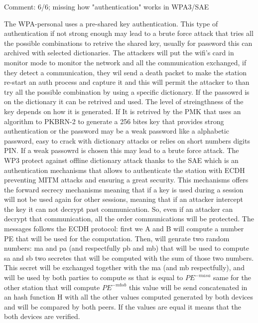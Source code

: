 \begin{solution}
    Comment: 6/6; missing how "authentication" works in WPA3/SAE

    The WPA-personal uses a pre-shared key authentication. This type of authentication if not strong enough may lead to a brute force attack that tries all the possible combinations to retrive the shared key, usually for password this can archived with selected dictionaries. The attackers will put the wifi's card in monitor mode to monitor the network and all the communication exchanged, if they detect a communication, they wil send a death packet to make the station re-start an auth process and capture it and this will permit the attacker to than try all the possible combination by using a specific dictionary. If the passowrd is on the dictionary it can be retrived and used. The level of streingthness of the key depends on how it is generated. If It is retrived by the PMK that uses an algorithm to PKBRN-2 to generate a 256 bites key that provides strong authentication or the password may be a weak password like a alphabetic password, easy to crack with dictionary attacks or relies on short numbers digits PIN. If a weak passowrd is chosen this may lead to a brute force attack.
    The WP3 protect against offline dictionary attack thanks to the SAE which is an authentication mechanisms that allows to authenticate the station with ECDH preventing MITM attacks and ensuring a great security. This mechanisms offers the forward secrecy mechanisms meaning that if a key is used during a session will not be used again for other sessions, meaning that if an attacker intercept the key it can not decrypt past communication. So, even if an attacker can decrypt that communication, all the order communications will be protected.
    The messages follows the ECDH protocol: first we A and B will compute a number PE that will be used for the computation. Then, will genrate two random numbers: ma and pa (and respectfully pb and mb) that will be used to compute sa and sb two secretes that will be computed with the sum of those two numbers. This secret will be exchanged together with the ma (and mb respectfully), and will be used by both parties to compute ss that is equal to $PE^{-masa}$ same for the other station that will compute $PE^{-mbsb}$ this value will be send concatenated in an hash function H with all the other values computed generated by both devices and will be compared by both peers. If the values are equal it means that the both devices are verified.
\end{solution}

